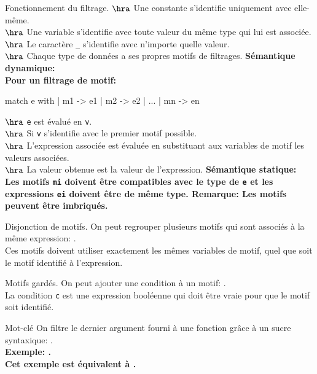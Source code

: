 \documentclass[french, 11pt]{article}
\begin{document}
\begin{defi}{Fonctionnement du filtrage.}{}
    $\hra$ Une constante s'identifie uniquement avec elle-même.\\
    $\hra$ Une variable s'identifie avec toute valeur du même type qui lui est associée.\\
    $\hra$ Le caractère \texttt{\_} s'identifie avec n'importe quelle valeur.\\
    $\hra$ Chaque type de données a ses propres motifs de filtrages.\n
    \bf{Sémantique dynamique:}\\
    Pour un filtrage de motif:
    \begin{pygmented}[lang=ocaml, hidealllines=true, linenos=true]
    match e with | m1 -> e1 | m2 -> e2 | ... | mn -> en
    \end{pygmented}
    $\hra$ \texttt{e} est évalué en \texttt{v}.\\
    $\hra$ Si \texttt{v} s'identifie avec le premier motif possible.\\
    $\hra$ L'expression associée est évaluée en substituant aux variables de motif les valeurs associées.\\
    $\hra$ La valeur obtenue est la valeur de l'expression.\n
    \bf{Sémantique statique:}\\
    Les motifs \texttt{mi} doivent être compatibles avec le type de \texttt{e} et les expressions \texttt{ei} doivent être de même type.\n
    \bf{Remarque:} Les motifs peuvent être imbriqués.
\end{defi}

\begin{defi}{Disjonction de motifs.}{}
    On peut regrouper plusieurs motifs qui sont associés à la même expression: .\\
    Ces motifs doivent utiliser exactement les mêmes variables de motif, quel que soit le motif identifié à l'expression.
\end{defi}

\begin{defi}{Motifs gardés.}{}
    On peut ajouter une condition à un motif: .\\
    La condition \texttt{c} est une expression booléenne qui doit être vraie pour que le motif soit identifié.
\end{defi}

\begin{defi}{Mot-clé }{}
    On filtre le dernier argument fourni à une fonction grâce à un sucre syntaxique: .\\
    \bf{Exemple:} .\\
    Cet exemple est équivalent à .
\end{defi}
\end{document}
